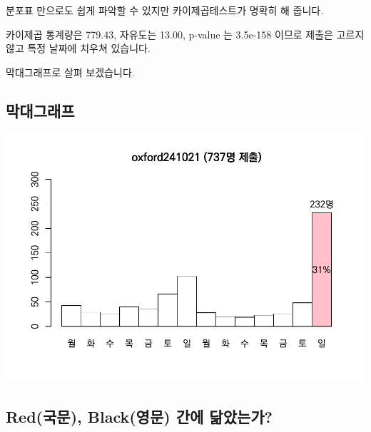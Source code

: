 \documentclass[
]{book}
\begin{document}
분포표 만으로도 쉽게 파악할 수 있지만 카이제곱테스트가 명확히 해 줍니다.

카이제곱 통계량은 779.43, 자유도는 13.00, p-value 는 3.5e-158 이므로 제출은 고르지 않고 특정 날짜에 치우쳐 있습니다.

막대그래프로 살펴 보겠습니다.

\subsection{막대그래프}\label{uxb9c9uxb300uxadf8uxb798uxd504-9}

\includegraphics{Quiz_report_2025_files/figure-latex/unnamed-chunk-247-1.pdf}

\subsection{Red(국문), Black(영문) 간에 닮았는가?}\label{reduxad6duxbb38-blackuxc601uxbb38-uxac04uxc5d0-uxb2eeuxc558uxb294uxac00}
\end{document}
